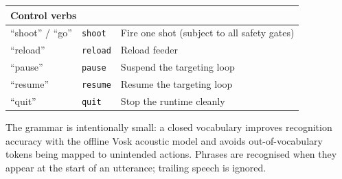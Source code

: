\begin{table}[htbp]
\begin{tabular}{|l|l|l|}
\hline
\multicolumn{3}{|l|}{\textbf{Control verbs}} \\
\hline
``shoot'' / ``go''  & \texttt{shoot}           & Fire one shot (subject to all safety gates) \\
\hline
``reload''          & \texttt{reload}          & Reload feeder \\
\hline
``pause''           & \texttt{pause}           & Suspend the targeting loop \\
\hline
``resume''          & \texttt{resume}          & Resume the targeting loop \\
\hline
``quit''            & \texttt{quit}            & Stop the runtime cleanly \\
\hline
\end{tabular}
\end{table}

The grammar is intentionally small: a closed vocabulary improves recognition accuracy with the offline Vosk acoustic model and avoids out-of-vocabulary tokens being mapped to unintended actions. Phrases are recognised when they appear at the start of an utterance; trailing speech is ignored.
